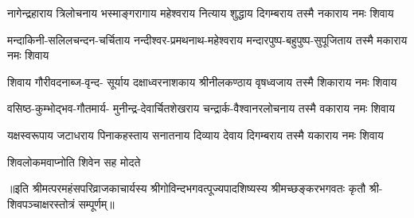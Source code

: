 

\fourlineindentedshloka
{नागेन्द्रहाराय त्रिलोचनाय}
{भस्माङ्गरागाय महेश्वराय}
{नित्याय शुद्धाय दिगम्बराय}
{तस्मै नकाराय नमः शिवाय}%

\fourlineindentedshloka
{मन्दाकिनी-सलिलचन्दन-चर्चिताय}
{नन्दीश्वर-प्रमथनाथ-महेश्वराय}
{मन्दारपुष्प-बहुपुष्प-सुपूजिताय}
{तस्मै मकाराय नमः शिवाय}%

\fourlineindentedshloka
{शिवाय गौरीवदनाब्ज-वृन्द-}
{सूर्याय दक्षाध्वरनाशकाय}
{श्रीनीलकण्ठाय वृषध्वजाय}
{तस्मै शिकाराय नमः शिवाय}%

\fourlineindentedshloka
{वसिष्ठ-कुम्भोद्भव-गौतमार्य-}
{मुनीन्द्र-देवार्चितशेखराय}
{चन्द्रार्क-वैश्वानरलोचनाय}
{तस्मै वकाराय नमः शिवाय}%

\fourlineindentedshloka
{यक्षस्वरूपाय जटाधराय}
{पिनाकहस्ताय सनातनाय}
{दिव्याय देवाय दिगम्बराय}
{तस्मै यकाराय नमः शिवाय}%

{शिवलोकमवाप्नोति शिवेन सह मोदते}

॥इति श्रीमत्परमहंसपरिव्राजकाचार्यस्य श्रीगोविन्दभगवत्पूज्यपादशिष्यस्य 
श्रीमच्छङ्करभगवतः कृतौ श्री-शिवपञ्चाक्षरस्तोत्रं सम्पूर्णम्॥